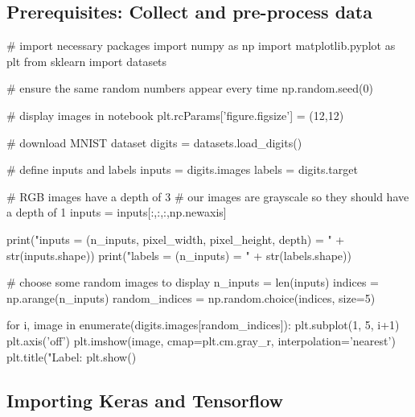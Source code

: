 \documentclass[%
oneside,                 %
final,                   %
10pt]{article}
\begin{document}
\subsection{Prerequisites: Collect and pre-process data}









































\bpycod
# import necessary packages
import numpy as np
import matplotlib.pyplot as plt
from sklearn import datasets


# ensure the same random numbers appear every time
np.random.seed(0)

# display images in notebook
plt.rcParams['figure.figsize'] = (12,12)


# download MNIST dataset
digits = datasets.load_digits()

# define inputs and labels
inputs = digits.images
labels = digits.target

# RGB images have a depth of 3
# our images are grayscale so they should have a depth of 1
inputs = inputs[:,:,:,np.newaxis]

print("inputs = (n_inputs, pixel_width, pixel_height, depth) = " + str(inputs.shape))
print("labels = (n_inputs) = " + str(labels.shape))


# choose some random images to display
n_inputs = len(inputs)
indices = np.arange(n_inputs)
random_indices = np.random.choice(indices, size=5)

for i, image in enumerate(digits.images[random_indices]):
    plt.subplot(1, 5, i+1)
    plt.axis('off')
    plt.imshow(image, cmap=plt.cm.gray_r, interpolation='nearest')
    plt.title("Label: %
plt.show()

\epycod


\subsection{Importing Keras and Tensorflow}
\end{document}
